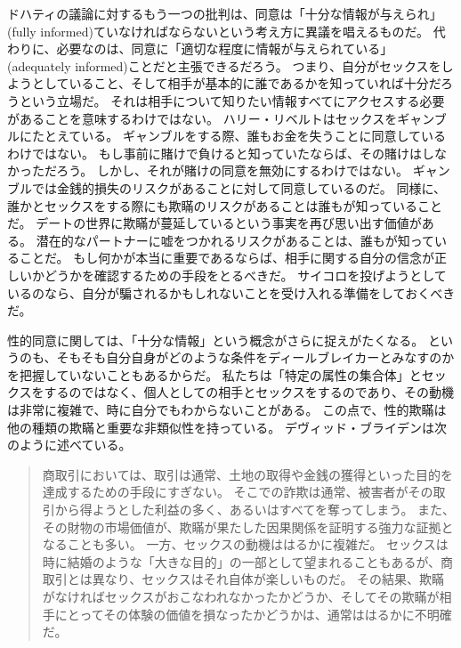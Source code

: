 \documentclass[paper=a4,book,openany]{jlreq}
\begin{document}
ドハティの議論に対するもう一つの批判は、同意は「十分な情報が与えられ」(fully informed)ていなければならないという考え方に異議を唱えるものだ。
代わりに、必要なのは、同意に「適切な程度に情報が与えられている」(adequately informed)ことだと主張できるだろう。
つまり、自分がセックスをしようとしていること、そして相手が基本的に誰であるかを知っていれば十分だろうという立場だ。
それは相手について知りたい情報すべてにアクセスする必要があることを意味するわけではない。
ハリー・リベルトはセックスをギャンブルにたとえている。
ギャンブルをする際、誰もお金を失うことに同意しているわけではない。
もし事前に賭けで負けると知っていたならば、その賭けはしなかっただろう。
しかし、それが賭けの同意を無効にするわけではない。
ギャンブルでは金銭的損失のリスクがあることに対して同意しているのだ。
同様に、誰かとセックスをする際にも欺瞞のリスクがあることは誰もが知っていることだ。
\citep[p.132]{liberto17:_inten_sexual_consen}
デートの世界に欺瞞が蔓延しているという事実を再び思い出す価値がある。
潜在的なパートナーに嘘をつかれるリスクがあることは、誰もが知っていることだ。
もし何かが本当に重要であるならば、相手に関する自分の信念が正しいかどうかを確認するための手段をとるべきだ。
サイコロを投げようとしているのなら、自分が騙されるかもしれないことを受け入れる準備をしておくべきだ。

性的同意に関しては、「十分な情報」という概念がさらに捉えがたくなる。
というのも、そもそも自分自身がどのような条件をディールブレイカーとみなすのかを把握していないこともあるからだ。
私たちは「特定の属性の集合体」とセックスをするのではなく、個人としての相手とセックスをするのであり、その動機は非常に複雑で、時に自分でもわからないことがある。
この点で、性的欺瞞は他の種類の欺瞞と重要な非類似性を持っている。
デヴィッド・ブライデンは次のように述べている。
\begin{quote}
商取引においては、取引は通常、土地の取得や金銭の獲得といった目的を達成するための手段にすぎない。
そこでの詐欺は通常、被害者がその取引から得ようとした利益の多く、あるいはすべてを奪ってしまう。
また、その財物の市場価値が、欺瞞が果たした因果関係を証明する強力な証拠となることも多い。
一方、セックスの動機ははるかに複雑だ。
セックスは時に結婚のような「大きな目的」の一部として望まれることもあるが、商取引とは異なり、セックスはそれ自体が楽しいものだ。
その結果、欺瞞がなければセックスがおこなわれなかったかどうか、そしてその欺瞞が相手にとってその体験の価値を損なったかどうかは、通常ははるかに不明確だ。
\citep[p.463]{bryden00:_redef_rape}

\end{quote}
\end{document}
